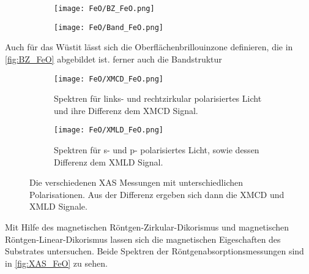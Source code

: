         \begin{figure}
            \begin{subfigure}[t]{0.34\textwidth}
                \centering
                \texttt{[image: FeO/BZ\_FeO.png]}
                \label{fig:BZ_FeO}
            \end{subfigure}
            \begin{subfigure}[t]{0.62\textwidth}
                \centering
                \texttt{[image: FeO/Band\_FeO.png]}
                \label{fig:Band_FeO}
            \end{subfigure}
        \end{figure}
        Auch für das Wüstit lässt sich die Oberflächenbrillouinzone definieren, die in \autoref{fig:BZ_FeO} abgebildet ist.
        ferner auch die Bandstruktur

        \begin{figure}
            \centering
            \begin{subfigure}[t]{0.48\textwidth}
                \centering
                \texttt{[image: FeO/XMCD\_FeO.png]}
                \caption{Spektren für links- und rechtzirkular polarisiertes Licht und ihre Differenz dem XMCD Signal.}
                \label{fig:XMCD}
            \end{subfigure}
            \begin{subfigure}[t]{0.48\textwidth}
                \centering
                \texttt{[image: FeO/XMLD\_FeO.png]}
                \caption{Spektren für s- und p- polarisiertes Licht, sowie dessen Differenz dem XMLD Signal.}
                \label{fig:XMLD}
            \end{subfigure}
            \caption{Die verschiedenen XAS Messungen mit unterschiedlichen Polarisationen. Aus der Differenz ergeben sich dann die XMCD und XMLD Signale.}
            \label{fig:XAS_FeO}
        \end{figure}
        Mit Hilfe des magnetischen Röntgen-Zirkular-Dikorismus und magnetischen Röntgen-Linear-Dikorismus lassen sich die magnetischen Eigeschaften des Substrates untersuchen.
        Beide Spektren der Röntgenabsorptionsmessungen sind in \autoref{fig:XAS_FeO} zu sehen.
        
